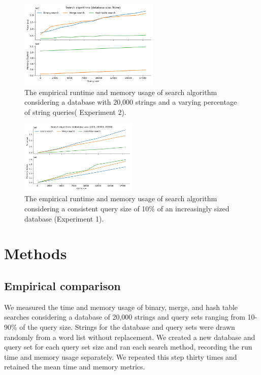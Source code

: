 \documentclass[11pt, letterpaper]{article}
\begin{document}
\begin{figure}[ht] \centering
    \includegraphics[width=0.6\textwidth]{./doc/db20000_qp90_r30.png}
    \caption{The empirical runtime and memory usage of search algorithm
    considering a database with 20,000 strings and a varying percentage 
    of string queries( Experiment 2).}
    \label{fig:experiment2}
\end{figure}

\begin{figure}[ht]
    \centering
    \includegraphics[width=0.5\textwidth]{./doc/db100-20000-200qp10.png}
    \caption{The empirical runtime and memory usage of search algorithm
    considering a consistent query size of 10\% of an increasingly 
    sized database (Experiment 1).}
    \label{fig:experiment1}
\end{figure}


\section{Methods}

\subsection{Empirical comparison}

We measured the time and memory usage of binary, merge, and
hash table searches considering a database of 20,000 strings and query sets
ranging from 10-90\% of the query size. Strings for the database and query sets
were drawn randomly from a word list without replacement. We created a new database 
and query set for each query set size and ran each search method, recording the run 
time and memory usage separately. We repeated this step thirty times and retained 
the mean time and memory metrics.
\end{document}
